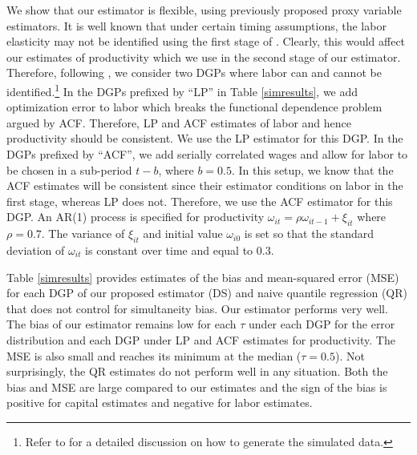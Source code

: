 \documentclass[12pt]{article}
\begin{document}
We show that our estimator is flexible, using previously proposed proxy variable estimators. It is well known that under certain timing assumptions, the labor elasticity may not be identified using the first stage of \cite{Levinsohn2003}. Clearly, this would affect our estimates of productivity which we use in the second stage of our estimator. Therefore, following \cite{Ackerberg2015}, we consider two DGPs where labor can and cannot be identified.\footnote{Refer to \cite{Ackerberg2015} for a detailed discussion on how to generate the simulated data.} In the DGPs prefixed by ``LP'' in Table \ref{simresults}, we add optimization error to labor which breaks the functional dependence problem argued by ACF. Therefore, LP and ACF estimates of labor and hence productivity should be consistent. We use the LP estimator for this DGP. In the DGPs prefixed by ``ACF'', we add serially correlated wages and allow for labor to be chosen in a sub-period $t-b$, where $b=0.5$. In this setup, we know that the ACF estimates will be consistent since their estimator conditions on labor in the first stage, whereas LP does not. Therefore, we use the ACF estimator for this DGP. An AR(1) process is specified for productivity $\omega_{it}=\rho\omega_{it-1}+\xi_{it}$ where $\rho=0.7$. The variance of $\xi_{it}$ and initial value $\omega_{i0}$ is set so that the standard deviation of $\omega_{it}$ is constant over time and equal to $0.3$. 

Table \ref{simresults} provides estimates of the bias and mean-squared error (MSE) for each DGP of our proposed estimator (DS) and naive quantile regression (QR) that does not control for simultaneity bias. Our estimator performs very well. The bias of our estimator remains low for each $\tau$ under each DGP for the error distribution and each DGP under LP and ACF estimates for productivity. The MSE is also small and reaches its minimum at the median ($\tau=0.5$). Not surprisingly, the QR estimates do not perform well in any situation. Both the bias and MSE are large compared to our estimates and the sign of the bias is positive for capital estimates and negative for labor estimates.
\end{document}
